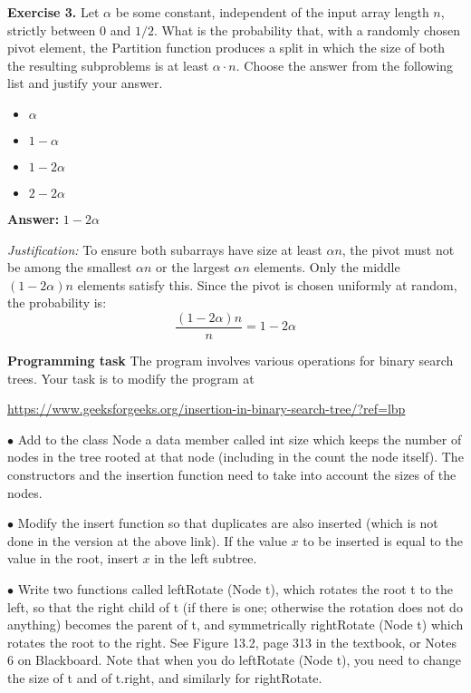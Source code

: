 \documentclass[11pt]{article}
\begin{document}
\textbf{Exercise 3.}
Let $\alpha$ be some constant, independent of the input array length $n$, strictly between $0$ and $1/2$. What is the probability that, with a randomly chosen pivot element, the \textsf{Partition} function produces a split in which the size of both the resulting subproblems is at least $\alpha \cdot n$. Choose the answer from the following list and justify your answer.
\begin{itemize}
\item $\alpha$
\item $1 - \alpha$
\item $1-2\alpha$
\item $2 - 2 \alpha$
\end{itemize}
\medskip

\textbf{Answer:} $1 - 2\alpha$

\textit{Justification:} To ensure both subarrays have size at least $\alpha n$, the pivot must not be among the smallest $\alpha n$ or the largest $\alpha n$ elements. Only the middle $(1 - 2\alpha)n$ elements satisfy this. Since the pivot is chosen uniformly at random, the probability is:
\[
\frac{(1 - 2\alpha)n}{n} = 1 - 2\alpha
\]

\bigskip


\newpage



\textbf{Programming task} The program involves various operations for binary search trees. Your task is to modify the program  at


\url{https://www.geeksforgeeks.org/insertion-in-binary-search-tree/?ref=lbp}
\medskip

$\bullet$ Add to the class \textsf{Node}  a data member called \textsf{int size} which keeps the number of nodes in the tree rooted at that node (including in the count the node itself). The constructors and the insertion function need to take into account the sizes of the nodes.
\medskip

$\bullet$ Modify the \textsf{insert} function so that duplicates are also inserted (which is not done in the version at the above link). If the value $x$  to be inserted is equal to the value in the root, insert $x$ in the left subtree.
\medskip





$\bullet$  Write two functions called \textsf{leftRotate (Node t)}, which rotates the root t to the left, so that the right child of t (if there is one; otherwise the rotation does not do anything) becomes the parent of t, and symmetrically  \textsf{rightRotate (Node t) which rotates the root to the right}. See Figure 13.2, page 313 in the textbook, or Notes 6 on Blackboard. Note that when you do \textsf{leftRotate (Node t)}, you need to change the size of \textsf{t} and of \textsf{t.right}, and similarly for \textsf{rightRotate}.
\end{document}
